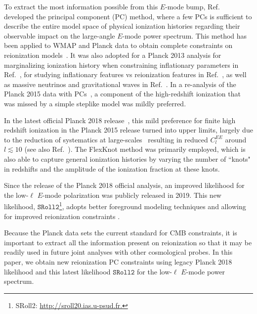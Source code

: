 \documentclass[aps,prd,twocolumn,amsmath,amssymb,showpacs,floatfix,superscriptaddress,nofootinbib]{revtex4-1}
\begin{document}
To extract the most information possible from this $E$-mode bump, Ref.~\cite{Hu:2003gh, Mortonson:2007hq} developed the principal component (PC) method, where a few PCs is sufficient to describe the entire model space of physical ionization histories regarding their observable impact on the large-angle $E$-mode power spectrum. This method has been applied to WMAP and Planck data to obtain complete constraints on reionization models~\cite{Mortonson:2008rx, Mortonson:2007hq, Heinrich:2016ojb, Aghanim:2018eyx}. It was also adopted for a Planck 2013 analysis for marginalizing ionization history when constraining inflationary parameters in Ref.~\cite{Planck:2013jfk}, for studying inflationary features vs reionization features in Ref.~\cite{Obied:2018qdr}, as well as massive neutrinos and gravitational waves in Ref.~\cite{Dai:2015dwa}. %
In a re-analysis of the Planck 2015 data with PCs~\cite{Heinrich:2016ojb}, a component of the high-redshift ionization that was missed by a simple steplike model was mildly preferred. 


In the latest official Planck 2018 release~\cite{Aghanim:2018eyx},  this mild preference for finite high redshift ionization in the Planck 2015 release turned into upper limits, largely due to the reduction of systematics at large-scales~\cite{Aghanim:2018eyx, Millea:2018bko} resulting in reduced $C_l^{EE}$ around $l \lesssim 10$ (see also Ref.~\cite{Heinrich:2018btc}). The FlexKnot method was primarily employed, which is also able to capture general ionization histories by varying the number of ``knots" in redshifts and the amplitude of the ionization fraction at these knots. 

Since the release of the Planck 2018 official analysis, an improved likelihood for the low-$\ell$ $E$-mode polarization was publicly released in 2019. This new likelihood,
$\texttt{SRoll2}$\footnote{SRoll2: \url{http://sroll20.ias.u-psud.fr.}}, adopts better foreground modeling techniques and allowing for improved reionization constraints \cite{Delouis:2019bub}.

Because the Planck data sets the current standard for CMB constraints, it is important to extract all the information present on reionization  so that it may be readily used in future joint analyses with other cosmological probes. In this paper, we obtain new reionization PC constraints using legacy Planck 2018 likelihood and this latest likelihood $\texttt{SRoll2}$ for the low-$\ell$ $E$-mode power spectrum. 
\end{document}
